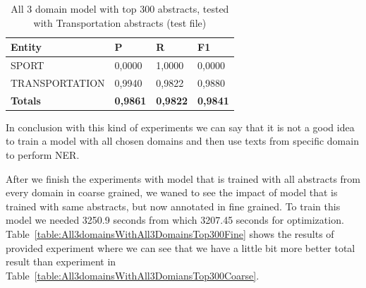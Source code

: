 \documentclass[thesis=M,english]{FITthesis}[2018/05/30]
\begin{document}
	\begin{table}[H]\centering
		\begin{tabular}{|l|l|l|l|}
			\hline {\textbf{Entity}} & {\textbf{P}} & {\textbf{R}} & {\textbf{F1}}\\\hline
				SPORT & 0,0000 & 1,0000 & 0,0000\\
				TRANSPORTATION & 0,9940 & 0,9822 & 0,9880\\\hline
				\textbf{Totals} & \textbf{0,9861} & \textbf{0,9822} & \textbf{0,9841}\\\hline
		\end{tabular}
	\caption{All 3 domain model with top 300 abstracts, tested with Transportation abstracts (test file) \label{table:All3domainsWithTransportationTop300Coarse}}
	\end{table}	
	
	In conclusion with this kind of experiments we can say that it is not a good idea to train a model with all chosen domains and then use texts from specific domain to perform NER.  

	After we finish the experiments with model that is trained with all abstracts from every domain in coarse grained, we waned to see the impact of model that is trained with same abstracts, but now annotated in fine grained. To train this model we needed 3250.9 seconds from which 3207.45 seconds for optimization. Table~\ref{table:All3domainsWithAll3DomainsTop300Fine} shows the results of provided experiment where we can see that we have a little bit more better total result than experiment in Table~\ref{table:All3domainsWithAll3DomiansTop300Coarse}.
\end{document}
